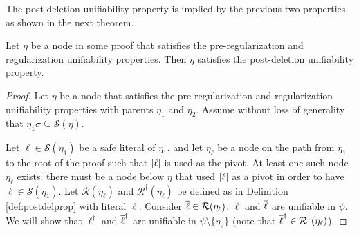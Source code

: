 The post-deletion unifiability property is implied by the previous two properties, as shown in the next theorem.

\begin{thm}
Let $\eta$ be a node in some proof that satisfies the pre-regularization and regularization unifiability properties. Then $\eta$ satisfies the post-deletion unifiability property.
\end{thm}

\begin{proof}
Let $\eta$ be a node that satisfies the pre-regularization and regularization unifiability properties with parents $\eta_1$ and $\eta_2$.
Assume without loss of generality that $\eta_1\sigma \subseteq \mathcal{S}(\eta)$.


Let $\ell \in \mathcal{S}(\eta_1)$ be a safe literal of $\eta_1$, and let $\eta_\ell$ be a node on the path from $\eta_1$ to the root of the proof such that $\lvert\ell\rvert$ is used as the pivot. At least one such node $\eta_\ell$ exists: there must be a node below $\eta$ that used $\lvert\ell\rvert$ as a pivot in order to have $\ell \in \mathcal{S}(\eta_1)$.
Let $\mathcal{R}(\eta_\ell)$ and $\mathcal{R}^\dagger(\eta_\ell)$ be defined as in Definition \ref{def:postdelprop} with literal $\ell$.
Consider $\overline{\ell} \in \mathcal{R}(\eta_\ell)$: $\ell$ and $\overline{\ell}$ are unifiable in $\psi$. We will show that $\ell^\dagger$ and $\overline{\ell}^\dagger$ are unifiable in $\psi\setminus\{\eta_2\}$ (note that $\overline{\ell}^\dagger\in \mathcal{R}^\dagger(\eta_\ell)$). 




\end{proof}
